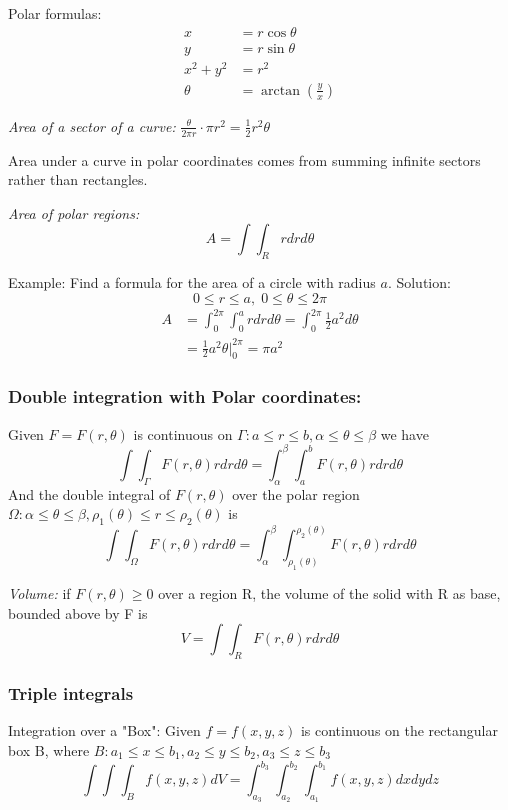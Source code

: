 \documentclass[12pt]{article}
\begin{document}
Polar formulas:
\begin{align*}
    x &= r\cos \theta\\
    y &= r \sin \theta\\
    x^2 + y^2 &= r^2\\
    \theta &= \arctan(\frac{y}{x})
\end{align*}

\emph{Area of a sector of a curve:} $\frac{\theta}{2\pi r} \cdot \pi r^2 = \frac{1}{2} r^2 \theta$

Area under a curve in polar coordinates comes from summing infinite sectors rather than rectangles. 

\emph{Area of polar regions:} 
\[A = \int \int_R r dr d\theta\]

Example: Find a formula for the area of a circle with radius $a$. 
Solution:
\[0 \leq r \leq a, \; 0 \leq \theta \leq 2 \pi\]
\begin{align*}
    A &= \int_0^{2\pi} \int_0^a r dr d\theta = \int_0^{2\pi} \frac{1}{2}a^2 d\theta\\
    &= \frac{1}{2}a^2 \theta \big|_0^{2\pi} = \pi a^2 
\end{align*}

\subsubsection{Double integration with Polar coordinates:}
Given $F = F(r, \theta)$ is continuous on $\Gamma: a \leq r \leq b, \alpha \leq \theta \leq \beta$ we have
\[\int \int_\Gamma F(r, \theta) r dr d\theta = \int_\alpha^\beta \int_a^b F(r, \theta) r dr d\theta\]
And the double integral of $F(r, \theta)$ over the polar region $\Omega: \alpha \leq \theta \leq \beta, \rho_1(\theta) \leq r \leq \rho_2(\theta)$ is 
\[\int \int_\Omega F(r, \theta) r dr d\theta = \int_\alpha^\beta \int_{\rho_1(\theta)}^{\rho_2(\theta)} F(r,\theta) r dr d\theta \]

\emph{Volume:} if $F(r, \theta) \geq 0$ over a region R, the volume of the solid with R as base, bounded above by F is 
\[V = \int \int_R F(r, \theta) r dr d\theta \]

\subsubsection{Triple integrals}
Integration over a "Box": Given $f = f(x,y,z)$ is continuous on the rectangular box B, where $B: a_1\leq x \leq b_1, a_2 \leq y \leq b_2, a_3 \leq z \leq b_3$
\[\int \int \int_B f(x,y,z) dV = \int_{a_3}^{b_3} \int_{a_2}^{b_2} \int_{a_1}^{b_1} f(x, y, z) dx dy dz\]
\end{document}
